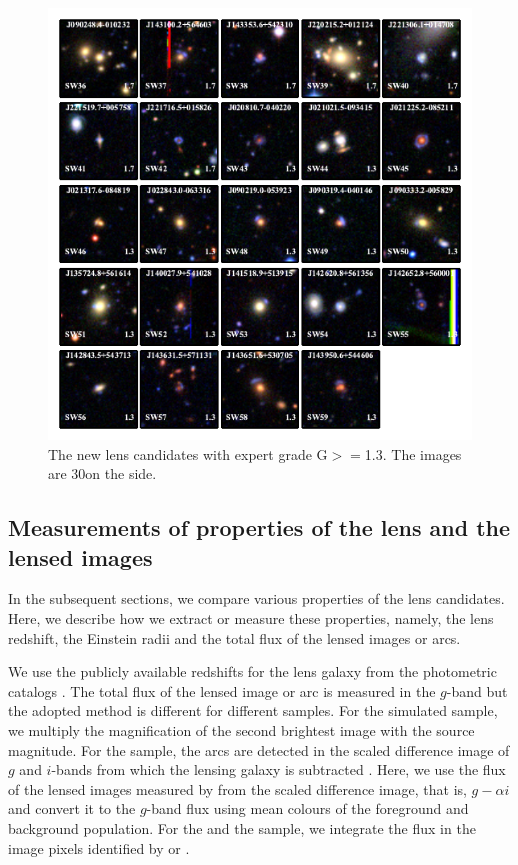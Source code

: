 \documentclass[useAMS,usenatbib,a4paper]{mn2e}
\begin{document}
\begin{figure}
\begin{center}
\includegraphics[scale=1.9]{lenscandfin_1.pdf}
\caption{ \label{fig:lc}
The new \sw lens candidates with expert grade G$>=$1.3. The images are
30\arcsec on the side.
}
\end{center}
\end{figure}


\subsection{Measurements of properties of the lens and the lensed images}
\label{sec:results:meas}

In the subsequent sections, we compare various properties of the lens
candidates. Here, we describe how we extract or measure these properties, namely,
the lens redshift, the Einstein radii and the total flux of the lensed images or
arcs.

We use the publicly available redshifts for the lens galaxy from the
\cfhtls photometric catalogs \citep{Coupon2009}. The total flux of the
lensed image or arc is measured in the $g$-band but the adopted method
is different for different samples. For the simulated sample, we
multiply the magnification of the second brightest image with the source
magnitude. For the \rf sample, the arcs are detected in the scaled
difference image of $g$ and $i$-bands from which the lensing galaxy is
subtracted \citep[for details, see][]{Gavazzi2014}. Here, we use the flux
of the lensed images measured by \sextractor from the scaled
difference image, that is, $g-\alpha i$ and convert it to the $g$-band
flux using mean colours of the foreground and background population. For
the \af and the \sw sample, we integrate the flux in the image pixels
identified by \af or \sextractor.
\end{document}

